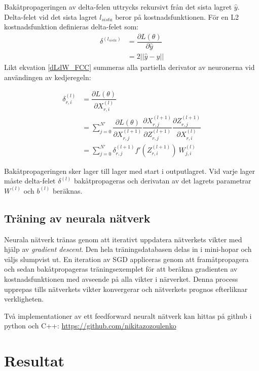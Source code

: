 \documentclass[a4paper,11pt,twoside]{article}
\newcommand*{\pd}[2]{\ensuremath{\dfrac{\partial #1}{\partial #2}}}
\begin{document}
Bakåtpropageringen av delta-felen uttrycks rekursivt från det sista lagret $\hat{y}$. Delta-felet vid det sista lagret $l_{sista}$ beror på kostnadsfunktionen. För en L2 kostnadsfunktion definieras delta-felet som: \cite{cs231n}
\begin{equation}
\begin{split}
\delta^{(l_{sista})}
	& = \pd{L(\theta)}{\hat{y}}  \\
	& = 2 ||\hat{y}-y||
\end{split}
\end{equation}
Likt ekvation \eqref{dLdW_FCC} summeras alla  partiella derivator av neuronerna vid användingen av kedjeregeln: \cite{cs231n}

\begin{equation}\label{dLdX_FCC}
\begin{split}
\delta^{(l)}_{r,i}
	& = \pd{L(\theta)}{X^{(l)}_{r,i}}  \\
	& = \sum^{N'}_{j=0} \pd{L(\theta)}{X^{(l+1)}_{r,j}} \pd{X^{(l+1)}_{r,j}}{Z^{(l+1)}_{r,j}} \pd{Z^{(l+1)}_{r,j}}{X^{(l)}_{r,i}} \\
	& = \sum^{N'}_{j=0} \delta^{(l+1)}_{r,j} f'(Z^{(l+1)}_{r,i}) \ W^{(l)}_{j,i} 
\end{split}
\end{equation}

Bakåtpropageringen sker lager till lager med start i outputlagret. Vid varje lager måste delta-felet $\delta^{(l)}$ bakåtpropageras och derivatan av det lagrets parametrar $W^{(l)}$ och $b^{(l)}$ beräknas. \cite{cs231n}

\subsection{Träning av neurala nätverk}
Neurala nätverk tränas genom att iterativt uppdatera nätverkets vikter med hjälp av \textit{gradient descent}. Den hela träningsdatabasen delas in i mini-hopar och väljs slumpvist ut. En iteration av SGD appliceras genom att framåtpropagera och sedan bakåtpropageras träningsexemplet för att beräkna gradienten av kostnadsfunktionen med avseende på alla vikter i närverket. Denna process upprepas tills nätverkets vikter konvergerar och nätverkets prognos efterliknar verkligheten. \cite{cs231n}

Två implementationer av ett feedforward neuralt nätverk kan hittas på github i python och C++: \url{https://github.com/nikitazozoulenko}
\newpage
\section{Resultat}
\end{document}
